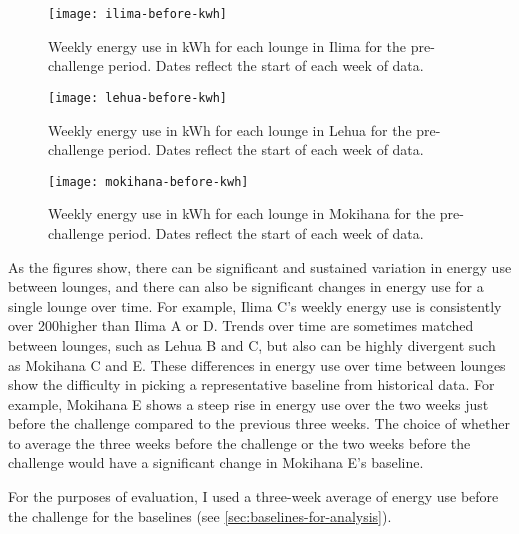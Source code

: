 \begin{figure}[htbp]
	\centering
	\texttt{[image: ilima-before-kwh]}
	\caption[Weekly pre-challenge energy use for each lounge in Ilima]{Weekly energy use in kWh for each lounge in Ilima for the pre-challenge period. Dates reflect the start of each week of data.}
	\label{fig:ilima-before-kwh}
\end{figure}

\begin{figure}[htbp]
	\centering
	\texttt{[image: lehua-before-kwh]}
	\caption[Weekly pre-challenge energy use for each lounge in Lehua]{Weekly energy use in kWh for each lounge in Lehua for the pre-challenge period. Dates reflect the start of each week of data.}
	\label{fig:lehua-before-kwh}
\end{figure}

\begin{figure}[htbp]
	\centering
	\texttt{[image: mokihana-before-kwh]}
	\caption[Weekly pre-challenge energy use for each lounge in Mokihana]{Weekly energy use in kWh for each lounge in Mokihana for the pre-challenge period. Dates reflect the start of each week of data.}
	\label{fig:mokihana-before-kwh}
\end{figure}

As the figures show, there can be significant and sustained variation in energy use between lounges, and there can also be significant changes in energy use for a single lounge over time. For example, Ilima C's weekly energy use is consistently over 200\kWh higher than Ilima A or D. Trends over time are sometimes matched between lounges, such as Lehua B and C, but also can be highly divergent such as Mokihana C and E. These differences in energy use over time between lounges show the difficulty in picking a representative baseline from historical data. For example, Mokihana E shows a steep rise in energy use over the two weeks just before the challenge compared to the previous three weeks. The choice of whether to average the three weeks before the challenge or the two weeks before the challenge would have a significant change in Mokihana E's baseline.

For the purposes of evaluation, I used a three-week average of energy use before the challenge for the baselines (see \autoref{sec:baselines-for-analysis}). 

